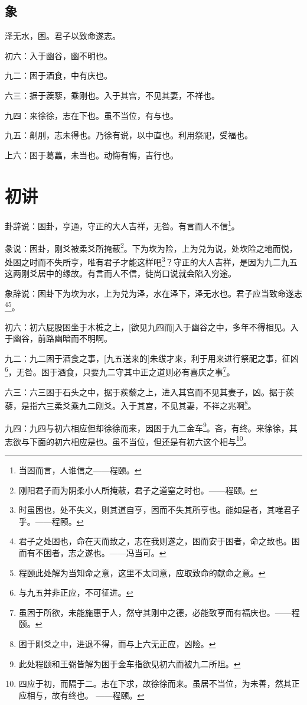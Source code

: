 \documentclass[12pt,oneside]{book}
\begin{document}
\subsection{象}
泽无水，困。君子以致命遂志。

初六：入于幽谷，幽不明也。

九二：困于酒食，中有庆也。

六三：据于蒺藜，乘刚也。入于其宫，不见其妻，不祥也。

九四：来徐徐，志在下也。虽不当位，有与也。

九五：劓刖，志未得也。乃徐有说，以中直也。利用祭祀，受福也。

上六：困于葛藟，未当也。动悔有悔，吉行也。

\section{初讲}
卦辞说：困卦，亨通，守正的大人吉祥，无咎。有言而人不信\footnote{当困而言，人谁信之——程颐。}。

彖说：困卦，刚爻被柔爻所掩蔽\footnote{刚阳君子而为阴柔小人所掩蔽，君子之道窒之时也。——程颐。}。下为坎为险，上为兑为说，处坎险之地而悦，处困之时而不失所亨，唯有君子才能这样吧\footnote{时虽困也，处不失义，则其道自亨，困而不失其所亨也。能如是者，其唯君子乎。——程颐。}？守正的大人吉祥，是因为九二九五这两刚爻居中的缘故。有言而人不信，徒尚口说就会陷入穷途。

象辞说：困卦下为坎为水，上为兑为泽，水在泽下，泽无水也。君子应当致命遂志\footnote{君子之处困也，命在天而致之，志在我则遂之，困而安于困者，命之致也。困而有不困者，志之遂也。——冯当可。}\footnote{程颐此处解为当知命之意，这里不太同意，应取致命的献命之意。}。


初六：初六屁股困坐于木桩之上，[欲见九四而]入于幽谷之中，多年不得相见。入于幽谷，前路幽暗而不明啊。

九二：九二困于酒食之事，[九五送来的]朱绂才来，利于用来进行祭祀之事，征凶\footnote{与九五并非正应，不可征进。}，无咎。困于酒食，只要九二守其中正之道则必有喜庆之事\footnote{虽困于所欲，未能施惠于人，然守其刚中之德，必能致亨而有福庆也。——程颐。}。

六三：六三困于石头之中，据于蒺藜之上，进入其宫而不见其妻子，凶。据于蒺藜，是指六三柔爻乘九二刚爻。入于其宫，不见其妻，不祥之兆啊\footnote{困于刚爻之中，进退不得，而与上六无正应，凶险。}。

九四：九四与初六相应但却徐徐而来，因困于九二金车\footnote{此处程颐和王弼皆解为困于金车指欲见初六而被九二所阻。}。吝，有终。来徐徐，其志欲与下面的初六相应是也。虽不当位，但还是有初六这个相与\footnote{四应于初，而隔于二。志在下求，故徐徐而来。虽居不当位，为未善，然其正应相与，故有终也。 ——程颐。}。
\end{document}
